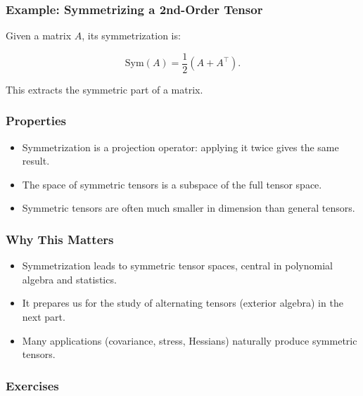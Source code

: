 \documentclass[
  letterpaper,
  DIV=11,
  numbers=noendperiod]{scrreprt}
\providecommand{\tightlist}{%
  \setlength{\itemsep}{0pt}\setlength{\parskip}{0pt}}
\begin{document}
\subsubsection{Example: Symmetrizing a 2nd-Order
Tensor}\label{example-symmetrizing-a-2nd-order-tensor}

Given a matrix \(A\), its symmetrization is:

\[
\mathrm{Sym}(A) = \frac{1}{2}(A + A^\top).
\]

This extracts the symmetric part of a matrix.

\subsubsection{Properties}\label{properties-1}

\begin{itemize}
\tightlist
\item
  Symmetrization is a projection operator: applying it twice gives the
  same result.
\item
  The space of symmetric tensors is a subspace of the full tensor space.
\item
  Symmetric tensors are often much smaller in dimension than general
  tensors.
\end{itemize}

\subsubsection{Why This Matters}\label{why-this-matters-13}

\begin{itemize}
\tightlist
\item
  Symmetrization leads to symmetric tensor spaces, central in polynomial
  algebra and statistics.
\item
  It prepares us for the study of alternating tensors (exterior algebra)
  in the next part.
\item
  Many applications (covariance, stress, Hessians) naturally produce
  symmetric tensors.
\end{itemize}

\subsubsection{Exercises}\label{exercises-24}
\end{document}
